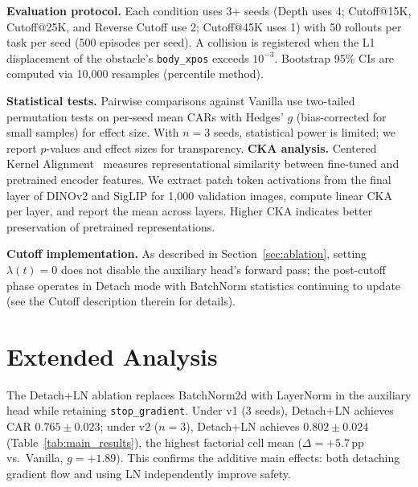 \textbf{Evaluation protocol.} Each condition uses 3+ seeds (Depth uses 4; Cutoff@15K, Cutoff@25K, and Reverse Cutoff use 2; Cutoff@45K uses 1) with 50 rollouts per task per seed (500 episodes per seed). A collision is registered when the L1 displacement of the obstacle's \texttt{body\_xpos} exceeds $10^{-3}$. Bootstrap 95\% CIs are computed via 10{,}000 resamples (percentile method).

\textbf{Statistical tests.} Pairwise comparisons against Vanilla use two-tailed permutation tests on per-seed mean CARs with Hedges' $g$ (bias-corrected for small samples) for effect size. With $n{=}3$ seeds, statistical power is limited; we report $p$-values and effect sizes for transparency.
\textbf{CKA analysis.} Centered Kernel Alignment~\cite{kornblith2019similarity} measures representational similarity between fine-tuned and pretrained encoder features. We extract patch token activations from the final layer of DINOv2 and SigLIP for 1{,}000 validation images, compute linear CKA per layer, and report the mean across layers. Higher CKA indicates better preservation of pretrained representations.

\textbf{Cutoff implementation.} As described in Section~\ref{sec:ablation}, setting $\lambda(t){=}0$ does not disable the auxiliary head's forward pass; the post-cutoff phase operates in Detach mode with BatchNorm statistics continuing to update (see the Cutoff description therein for details).

\section{Extended Analysis}


The Detach+LN ablation replaces BatchNorm2d with LayerNorm in the auxiliary head while retaining \texttt{stop\_gradient}. Under v1 (3 seeds), Detach+LN achieves CAR $0.765 \pm 0.023$; under v2 ($n{=}3$), Detach+LN achieves $0.802 \pm 0.024$ (Table~\ref{tab:main_results}), the highest factorial cell mean ($\Delta{=}+5.7$\,pp vs.\ Vanilla, $g{=}+1.89$). This confirms the additive main effects: both detaching gradient flow and using LN independently improve safety.

